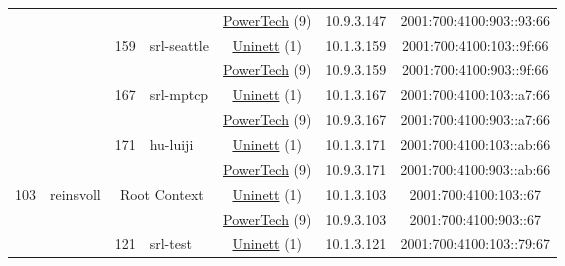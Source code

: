 \begin{small}
\begin{center}
\begin{longtable}{|c|c|c|c|c|c|c|c|}
  &  &  &  & \multicolumn{2}{|c|}{\tiny{\href{http://www.powertech.no}{PowerTech} (9)}} & \tiny{10.9.3.147} & \tiny{2001:700:4100:903::93:66} \\* \cline{3-3}\cline{4-4}\cline{5-5}\cline{6-6}\cline{7-7}\cline{8-8}
  &  & \multirow{2}{*}{\tiny{159}} & \multicolumn{1}{|l|}{\multirow{2}{*}{\tiny{srl-seattle}}} & \multicolumn{2}{|c|}{\tiny{\href{https://www.uninett.no}{Uninett} (1)}} & \tiny{10.1.3.159} & \tiny{2001:700:4100:103::9f:66} \\* \cline{5-5}\cline{6-6}\cline{7-7}\cline{8-8}
  &  &  &  & \multicolumn{2}{|c|}{\tiny{\href{http://www.powertech.no}{PowerTech} (9)}} & \tiny{10.9.3.159} & \tiny{2001:700:4100:903::9f:66} \\* \cline{3-3}\cline{4-4}\cline{5-5}\cline{6-6}\cline{7-7}\cline{8-8}
  &  & \multirow{2}{*}{\tiny{167}} & \multicolumn{1}{|l|}{\multirow{2}{*}{\tiny{srl-mptcp}}} & \multicolumn{2}{|c|}{\tiny{\href{https://www.uninett.no}{Uninett} (1)}} & \tiny{10.1.3.167} & \tiny{2001:700:4100:103::a7:66} \\* \cline{5-5}\cline{6-6}\cline{7-7}\cline{8-8}
  &  &  &  & \multicolumn{2}{|c|}{\tiny{\href{http://www.powertech.no}{PowerTech} (9)}} & \tiny{10.9.3.167} & \tiny{2001:700:4100:903::a7:66} \\* \cline{3-3}\cline{4-4}\cline{5-5}\cline{6-6}\cline{7-7}\cline{8-8}
  &  & \multirow{2}{*}{\tiny{171}} & \multicolumn{1}{|l|}{\multirow{2}{*}{\tiny{hu-luiji}}} & \multicolumn{2}{|c|}{\tiny{\href{https://www.uninett.no}{Uninett} (1)}} & \tiny{10.1.3.171} & \tiny{2001:700:4100:103::ab:66} \\* \cline{5-5}\cline{6-6}\cline{7-7}\cline{8-8}
  &  &  &  & \multicolumn{2}{|c|}{\tiny{\href{http://www.powertech.no}{PowerTech} (9)}} & \tiny{10.9.3.171} & \tiny{2001:700:4100:903::ab:66} \\ \hline
 \multirow{22}{*}{\tiny{103}} & \multicolumn{1}{|l|}{\multirow{22}{*}{\tiny{reinsvoll}}} & \multicolumn{2}{|c|}{\multirow{2}{*}{\tiny{Root Context}}} & \multicolumn{2}{|c|}{\tiny{\href{https://www.uninett.no}{Uninett} (1)}} & \tiny{10.1.3.103} & \tiny{2001:700:4100:103::67} \\* \cline{5-5}\cline{6-6}\cline{7-7}\cline{8-8}
  &  & \multicolumn{2}{|c|}{} & \multicolumn{2}{|c|}{\tiny{\href{http://www.powertech.no}{PowerTech} (9)}} & \tiny{10.9.3.103} & \tiny{2001:700:4100:903::67} \\* \cline{3-3}\cline{4-4}\cline{5-5}\cline{6-6}\cline{7-7}\cline{8-8}
  &  & \multirow{2}{*}{\tiny{121}} & \multicolumn{1}{|l|}{\multirow{2}{*}{\tiny{srl-test}}} & \multicolumn{2}{|c|}{\tiny{\href{https://www.uninett.no}{Uninett} (1)}} & \tiny{10.1.3.121} & \tiny{2001:700:4100:103::79:67} \\* \cline{5-5}\cline{6-6}\cline{7-7}\cline{8-8}

\end{longtable}
\end{center}
\end{small}
